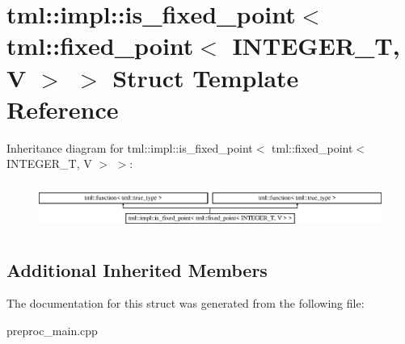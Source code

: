 \hypertarget{structtml_1_1impl_1_1is__fixed__point_3_01tml_1_1fixed__point_3_01INTEGER__T_00_01V_01_4_01_4}{\section{tml\+:\+:impl\+:\+:is\+\_\+fixed\+\_\+point$<$ tml\+:\+:fixed\+\_\+point$<$ I\+N\+T\+E\+G\+E\+R\+\_\+\+T, V $>$ $>$ Struct Template Reference}
\label{structtml_1_1impl_1_1is__fixed__point_3_01tml_1_1fixed__point_3_01INTEGER__T_00_01V_01_4_01_4}
}
Inheritance diagram for tml\+:\+:impl\+:\+:is\+\_\+fixed\+\_\+point$<$ tml\+:\+:fixed\+\_\+point$<$ I\+N\+T\+E\+G\+E\+R\+\_\+\+T, V $>$ $>$\+:\begin{figure}[H]
\begin{center}
\leavevmode
\includegraphics[height=1.555556cm]{structtml_1_1impl_1_1is__fixed__point_3_01tml_1_1fixed__point_3_01INTEGER__T_00_01V_01_4_01_4}
\end{center}
\end{figure}
\subsection*{Additional Inherited Members}


The documentation for this struct was generated from the following file\+:\begin{DoxyCompactItemize}
\item 
preproc\+\_\+main.\+cpp\end{DoxyCompactItemize}
